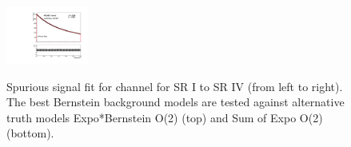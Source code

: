 \begin{figure}[htbp]
 \includegraphics[width=0.24\textwidth]{figures/VBF/Spurious_SExpoO2_testVBF_ICHEP_4cen_SRIV.pdf}\\
\caption{Spurious signal fit for \fourcentral channel for SR I to SR IV (from left to right). The best Bernstein background models are tested against alternative truth models Expo*Bernstein O(2) (top) and Sum of Expo O(2) (bottom).}
  \label{fig:vbf-Fit_SP_4cen}
\end{figure}

